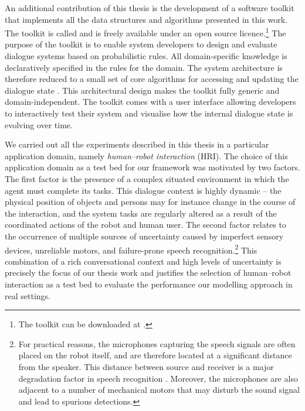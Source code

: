 An additional contribution of this thesis is the development of a software toolkit that implements all the data structures and algorithms presented in this work. The toolkit is called \opendial{}\index{\opendial{}}  and is freely available under an open source licence.\footnote{The toolkit can be downloaded at . } The purpose of the toolkit is to enable system developers to design and evaluate dialogue systems based on probabilistic rules. All domain-specific knowledge is declaratively specified in the rules for the domain. The system architecture is therefore reduced to a small set of core algorithms for accessing and updating the dialogue state \citep{lison-semdial2012}. This architectural design makes the toolkit fully generic and domain-independent. The \opendial{} toolkit comes with a user interface allowing developers to interactively test their system and visualise how the internal dialogue state is evolving over time.  %

We carried out all the experiments described in this thesis in a particular application domain, namely \textit{human--robot interaction}  (HRI).  The choice of this application domain as a test bed for our framework was motivated by two factors.  The first factor is the presence of a complex situated environment in which the agent must complete its tasks.  This dialogue context is highly dynamic -- the physical position of objects and persons may for instance change in the course of the interaction, and the system tasks are regularly altered as a result of the coordinated actions of the robot and human user. The second factor relates to the occurrence of multiple sources of uncertainty caused by imperfect sensory devices, unreliable motors, and failure-prone speech recognition.\footnote{For practical reasons, the microphones capturing the speech signals are often placed on the robot itself, and are therefore located at a significant distance from the speaker.  This distance between source and receiver is a major degradation factor in speech recognition \citep{wolfel2009distant}.  Moreover, the microphones are also adjacent to a number of mechanical motors that may disturb the sound signal and lead to spurious detections.} This combination of a rich conversational context and high levels of uncertainty is precisely the focus of our thesis work and justifies the selection of  human--robot interaction as a test bed to evaluate the performance our modelling approach in real settings.


